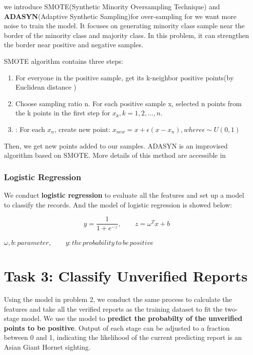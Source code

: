 \documentclass[12pt]{article}
\begin{document}
we introduce SMOTE(Synthetic Minority Oversampling Technique)\cite{Smote1} and \textbf{ADASYN}(Adaptive Synthetic Sampling)for over-sampling for we want more noise to train the model. It focuses on generating minority class sample near the border of the minority class and majority class. In this problem, it can strengthen the border near positive and negative samples.


SMOTE algorithm contains three steps:
\begin{enumerate}
	\item For everyone in the positive sample, get its k-neighbor positive points(by Euclidean distance )
	\item Choose sampling ratio n. For each positive sample x, selected n points from the k points in the first step for $x_k,k=1,2,...,n$. 
	\item: For each $x_n$, create new point: $x_{new}=x+\epsilon(x-x_n), where \epsilon \sim U(0,1)$
\end{enumerate}

Then, we get new points added to our samples. ADASYN is an improvised algorithm based on SMOTE. More details of this method are accessible in \cite{Smote3}

\subsubsection{Logistic Regression}
We conduct \textbf{logistic regression} to evaluate all the features and set up a model to classify the records. And the model of logistic regression is showed below:

\begin{equation}
y=\frac{1}{1+e^{-z}},\qquad z=\omega^Tx+b 
\end{equation}
\begin{center}
	$\omega,b:parameter,\qquad y:the\, probability\, to \,be\, positive$
\end{center}

\section{Task 3: Classify Unverified Reports}
Using the model in problem 2, we conduct the same process to calculate the features and take all the verified reports as the training dataset to fit the two-stage model. We use the model to \textbf{predict the probabilty of the unverified points to be positive}. Output of each stage can be adjusted to a fraction between 0 and 1, indicating the likelihood of the current predicting report is an Asian Giant Hornet sighting. 
\end{document}
